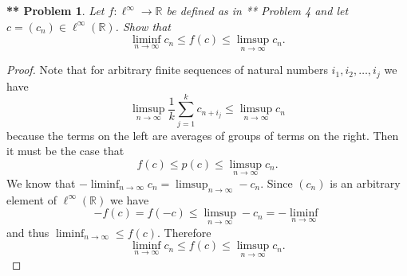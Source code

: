 \documentclass{article}
\newtheorem{**}{** Problem}
\begin{document}
\begin{flushleft}
\begin{**}
Let $f : \ell^{\infty} \rightarrow \mathbb{R}$ be defined as in ** Problem 4 and let $c = (c_n) \in \ell^{\infty} (\mathbb{R})$. Show that
\[
\liminf_{n \rightarrow \infty} c_n \leq f(c) \leq \limsup_{n \rightarrow \infty} c_n.
\]
\end{**}
\begin{proof}
Note that for arbitrary finite sequences of natural numbers $i_1, i_2, \dots , i_j$ we have
\[
\limsup_{n \rightarrow \infty} \frac{1}{k} \sum_{j=1}^{k} c_{n+i_j} \leq \limsup_{n \rightarrow \infty} c_n
\]
because the terms on the left are averages of groups of terms on the right. Then it must be the case that
\[
f(c) \leq p(c) \leq \limsup_{n \rightarrow \infty} c_n.
\]
We know that $-\liminf_{n \rightarrow \infty} c_n = \limsup_{n \rightarrow \infty} -c_n$. Since $(c_n)$ is an arbitrary element of $\ell^{\infty} (\mathbb{R})$ we have
\[
-f(c) = f(-c) \leq \limsup_{n \rightarrow \infty} -c_n = -\liminf_{n \rightarrow \infty}
\]
and thus $\liminf_{n \rightarrow \infty} \leq f(c)$. Therefore
\[
\liminf_{n \rightarrow \infty} c_n \leq f(c) \leq \limsup_{n \rightarrow \infty} c_n.
\]
\end{proof}


\end{flushleft}
\end{document}
